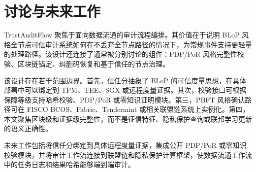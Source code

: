 \section{讨论与未来工作}

TrustAuditFlow 聚焦于面向数据流通的审计流程编排。其价值在于说明 BLoP 风格全节点可信审计系统如何在不丢弃全节点路径的情况下，为常规事件支持更轻量的处理路径。该设计还连接了通常被分别讨论的组件：PDP/PoR 风格完整性校验、区块链锚定、纠删码恢复和基于信任的节点治理。

该设计存在若干范围边界。首先，信任分抽象了 BLoP 的可信度量思想，在具体部署中可以绑定到 TPM、TEE、SGX 或远程度量证据。其次，校验接口可根据保障等级支持哈希校验、PDP/PoR 或零知识证明模块。第三，PBFT 风格确认路径可在 FISCO BCOS、Fabric、Tendermint 或相关联盟链系统上实例化。第四，本文聚焦区块级和证据级完整性，而不是征信特征、隐私保护查询或联邦学习更新的语义正确性。

未来工作包括将信任分绑定到具体远程度量证据，集成公开 PDP/PoR 或零知识校验模块，并将审计工作流连接到联盟链和隐私保护计算框架，使数据流通工作流中的任务日志和结果哈希能够端到端审计。


